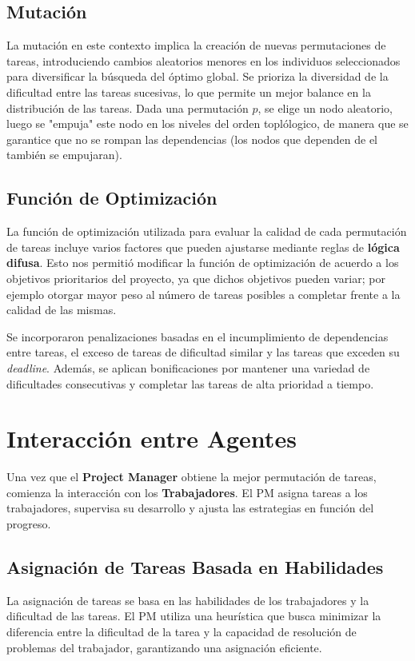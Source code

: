 \documentclass[a4paper, 12pt]{article}
\begin{document}
\subsection{Mutación}
La mutación en este contexto implica la creación de nuevas permutaciones de tareas, introduciendo cambios aleatorios menores en los individuos seleccionados para diversificar la búsqueda del óptimo global. Se prioriza la diversidad de la dificultad entre las tareas sucesivas, lo que permite un mejor balance en la distribución de las tareas. Dada una permutación $p$, se elige un nodo aleatorio, luego se "empuja" este nodo en los niveles del orden topl\'ologico, de manera que se garantice que no se rompan las dependencias (los nodos que dependen de el también se empujaran).

\subsection{Función de Optimización}
La función de optimización utilizada para evaluar la calidad de cada permutación de tareas incluye varios factores que pueden ajustarse mediante reglas de \textbf{lógica difusa}. Esto nos permitió modificar la funci\'on de optimización de acuerdo a los objetivos prioritarios del proyecto, ya que dichos objetivos pueden variar; por ejemplo otorgar mayor peso al número de tareas posibles a completar frente a la calidad de las mismas.

Se incorporaron penalizaciones basadas en el incumplimiento de dependencias entre tareas, el exceso de tareas de dificultad similar y las tareas que exceden su \textit{deadline}. Además, se aplican bonificaciones por mantener una variedad de dificultades consecutivas y completar las tareas de alta prioridad a tiempo.

\section{Interacción entre Agentes}
Una vez que el \textbf{Project Manager} obtiene la mejor permutación de tareas, comienza la interacción con los \textbf{Trabajadores}. El PM asigna tareas a los trabajadores, supervisa su desarrollo y ajusta las estrategias en función del progreso.

\subsection{Asignación de Tareas Basada en Habilidades}
La asignación de tareas se basa en las habilidades de los trabajadores y la dificultad de las tareas. El PM utiliza una heurística que busca minimizar la diferencia entre la dificultad de la tarea y la capacidad de resolución de problemas del trabajador, garantizando una asignación eficiente.
\end{document}
